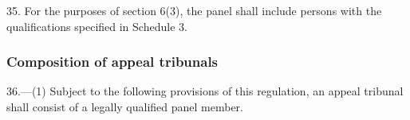 \documentclass[12pt,a4paper]{article}
\begin{document}
\renewcommand\parthead{--- Part V Chapter I}

35.  For the purposes of section 6(3), the panel shall include persons with the qualifications specified in Schedule 3.

\subsubsection[36. Composition of appeal tribunals]{Composition of appeal tribunals}

36.—(1) Subject to the following provisions of this regulation, an appeal tribunal
shall consist of a legally qualified panel member.

%
%
%
%
\end{document}
